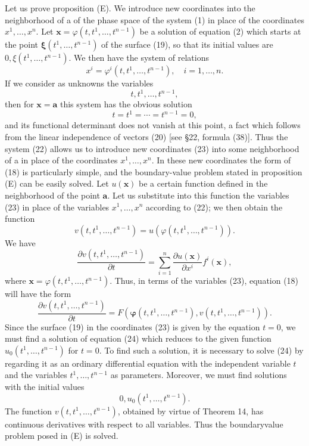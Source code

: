 \documentclass[10pt,a5paper]{book}
\theoremstyle{plain}
\theoremstyle{definition}
\theoremstyle{remark}
\begin{document}
Let us prove proposition (E). We introduce new coordinates into the neighborhood of a of the phase space of the system (1) in place of the coordinates $x^{1}, \ldots, x^{n}$. Let $\mathbf{x}=\varphi\left(t, t^{1}, \ldots, t^{n-1}\right)$ be a solution of equation (2) which starts at the point $\boldsymbol{\xi}\left(t^{1}, \ldots, t^{n-1}\right)$ of the surface (19), so that its initial values are $0, \xi\left(t^{1}, \ldots, t^{n-1}\right)$. We then have the system of relations
\begin{equation*}
x^{i}=\varphi^{i}\left(t, t^{1}, \ldots, t^{n-1}\right), \quad i=1, \ldots, n . \tag{22}
\end{equation*}
If we consider as unknowns the variables
\begin{equation*}
t, t^{1}, \ldots, t^{n-1}, \tag{23}
\end{equation*}
then for $\mathbf{x}=\mathbf{a}$ this system has the obvious solution
\[
t=t^{1}=\cdots=t^{n-1}=0,
\]
and its functional determinant does not vanish at this point, a fact which follows from the linear independence of vectors (20) [see §22, formula (38)]. Thus the system (22) allows us to introduce new coordinates (23) into some neighborhood of a in place of the coordinates $x^{1}, \ldots, x^{n}$. In these new coordinates the form of (18) is particularly simple, and the boundary-value problem stated in proposition (E) can be easily solved. Let $u(\mathbf{x})$ be a certain function defined in the neighborhood of the point $\mathbf{a}$. Let us substitute into this function the variables (23) in place of the variables $x^{1}, \ldots, x^{n}$ according to (22); we then obtain the function
\[
v\left(t, t^{1}, \ldots, t^{n-1}\right)=u\left(\varphi\left(t, t^{1}, \ldots, t^{n-1}\right)\right) .
\]
We have
\[
\frac{\partial v\left(t, t^{1}, \ldots, t^{n-1}\right)}{\partial t}=\sum_{i=1}^{n} \frac{\partial u(\mathbf{x})}{\partial x^{i}} f^{i}(\mathbf{x}),
\]
where $\mathbf{x}=\varphi\left(t, t^{1}, \ldots, t^{n-1}\right)$. Thus, in terms of the variables (23), equation (18) will have the form
\begin{equation*}
\frac{\partial v\left(t, t^{1}, \ldots, t^{n-1}\right)}{\partial t}=F\left(\boldsymbol{\varphi}\left(t, t^{1}, \ldots, t^{n-1}\right), v\left(t, t^{1}, \ldots, t^{n-1}\right)\right) . \tag{24}
\end{equation*}
Since the surface (19) in the coordinates (23) is given by the equation $t=0$, we must find a solution of equation (24) which reduces to the given function $u_{0}\left(t^{1}, \ldots, t^{n-1}\right)$ for $t=0$. To find such a solution, it is necessary to solve (24) by regarding it as an ordinary differential equation with the independent variable $t$ and the variables $t^{1}, \ldots, t^{n-1}$ as parameters. Moreover, we must find solutions with the initial values
\[
0, u_{0}\left(t^{1}, \ldots, t^{n-1}\right) .
\]
The function $v\left(t, t^{1}, \ldots, t^{n-1}\right)$, obtained by virtue of Theorem 14, has continuous derivatives with respect to all variables. Thus the boundaryvalue problem posed in (E) is solved.
\end{document}

